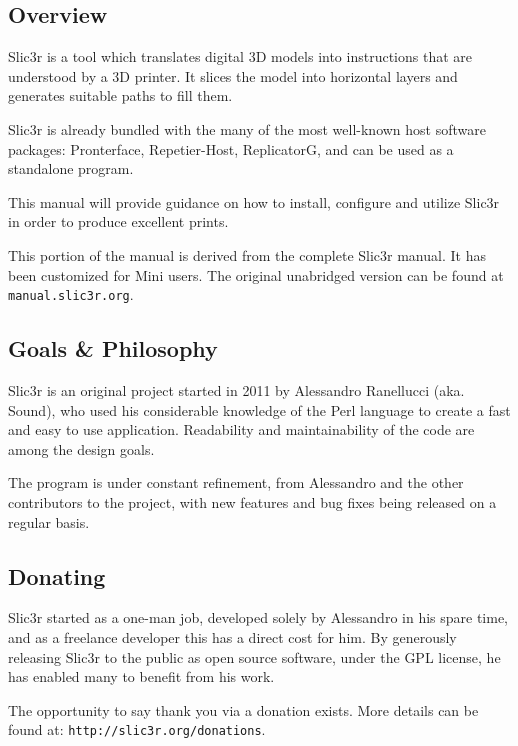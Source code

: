 
\subsection{Overview} %
\label{sec:overview}

Slic3r is a tool which translates digital 3D models into instructions that are understood by a 3D printer.  It slices the model into horizontal layers and generates suitable paths to fill them.

Slic3r is already bundled with the many of the most well-known host software packages: Pronterface, Repetier-Host, ReplicatorG, and can be used as a standalone program.

This manual will provide guidance on how to install, configure and utilize Slic3r in order to produce excellent prints.

This portion of the manual is derived from the complete Slic3r manual. It has been customized for Mini users. The original unabridged version can be found at \texttt{manual.slic3r.org}.



\subsection{Goals \& Philosophy} %
\label{sec:goals_philosophy}

Slic3r is an original project started in 2011 by Alessandro Ranellucci (aka. Sound), who used his considerable knowledge of the Perl language to create a fast and easy to use application.  Readability and maintainability of the code are among the design goals.

The program is under constant refinement, from Alessandro and the other contributors to the project, with new features and bug fixes being released on a regular basis.



\subsection{Donating} %
\label{sec:donating}

Slic3r started as a one-man job, developed solely by Alessandro in his spare time, and as a freelance developer this has a direct cost for him.  By generously releasing Slic3r to the public as open source software, under the GPL license, he has enabled many to benefit from his work.

The opportunity to say thank you via a donation exists.  More details can be found at: \texttt{http://slic3r.org/donations}.


